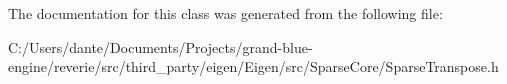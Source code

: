 The documentation for this class was generated from the following file\+:\begin{DoxyCompactItemize}
\item 
C\+:/\+Users/dante/\+Documents/\+Projects/grand-\/blue-\/engine/reverie/src/third\+\_\+party/eigen/\+Eigen/src/\+Sparse\+Core/Sparse\+Transpose.\+h\end{DoxyCompactItemize}
